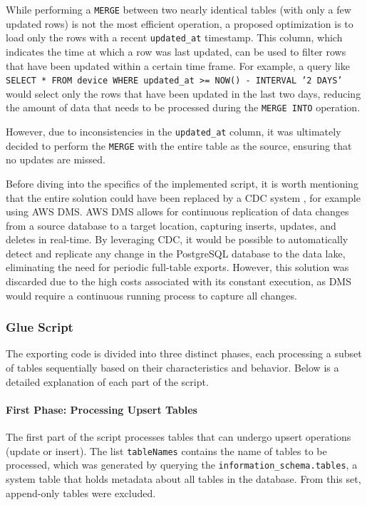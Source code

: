 While performing a \texttt{MERGE} between two nearly identical tables (with only a few updated rows) is not the most efficient operation, a proposed optimization is to load only the rows with a recent \texttt{updated\_at} timestamp. This column, which indicates the time at which a row was last updated, can be used to filter rows that have been updated within a certain time frame. For example, a query like \texttt{SELECT * FROM device WHERE updated\_at >= NOW() - INTERVAL '2 DAYS'} would select only the rows that have been updated in the last two days, reducing the amount of data that needs to be processed during the \texttt{MERGE INTO} operation.

However, due to inconsistencies in the \texttt{updated\_at} column, it was ultimately decided to perform the \texttt{MERGE} with the entire table as the source, ensuring that no updates are missed.

Before diving into the specifics of the implemented script, it is worth mentioning that the entire solution could have been replaced by a \ac{CDC} system \cite{cdc}, for example using \ac{AWS} \ac{DMS}. \ac{AWS} \ac{DMS} allows for continuous replication of data changes from a source database to a target location, capturing inserts, updates, and deletes in real-time. By leveraging \ac{CDC}, it would be possible to automatically detect and replicate any change in the PostgreSQL database to the data lake, eliminating the need for periodic full-table exports. However, this solution was discarded due to the high costs associated with its constant execution, as \ac{DMS} would require a continuous running process to capture all changes.

\subsubsection{Glue Script}

The exporting code is divided into three distinct phases, each processing a subset of tables sequentially based on their characteristics and behavior. Below is a detailed explanation of each part of the script.

\paragraph{First Phase: Processing Upsert Tables}

The first part of the script processes tables that can undergo upsert operations (update or insert). The list \texttt{tableNames} contains the name of tables to be processed, which was generated by querying the \texttt{information\_schema.tables}, a system table that holds metadata about all tables in the database. From this set, append-only tables were excluded.

